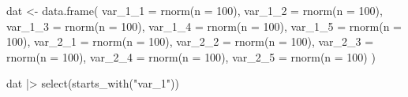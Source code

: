 \documentclass[
  letterpaper,
  DIV=11,
  numbers=noendperiod]{scrreprt}
\newenvironment{Shaded}{\begin{snugshade}}{\end{snugshade}}
\newcommand{\AttributeTok}[1]{\textcolor[rgb]{0.40,0.45,0.13}{#1}}
\newcommand{\DecValTok}[1]{\textcolor[rgb]{0.68,0.00,0.00}{#1}}
\newcommand{\FunctionTok}[1]{\textcolor[rgb]{0.28,0.35,0.67}{#1}}
\newcommand{\NormalTok}[1]{\textcolor[rgb]{0.00,0.23,0.31}{#1}}
\newcommand{\OtherTok}[1]{\textcolor[rgb]{0.00,0.23,0.31}{#1}}
\newcommand{\SpecialCharTok}[1]{\textcolor[rgb]{0.37,0.37,0.37}{#1}}
\newcommand{\StringTok}[1]{\textcolor[rgb]{0.13,0.47,0.30}{#1}}
\begin{document}
\begin{Shaded}
\begin{Highlighting}[]
\NormalTok{dat }\OtherTok{\textless{}{-}} \FunctionTok{data.frame}\NormalTok{(}
  \AttributeTok{var\_1\_1 =} \FunctionTok{rnorm}\NormalTok{(}\AttributeTok{n =} \DecValTok{100}\NormalTok{),}
  \AttributeTok{var\_1\_2 =} \FunctionTok{rnorm}\NormalTok{(}\AttributeTok{n =} \DecValTok{100}\NormalTok{),}
  \AttributeTok{var\_1\_3 =} \FunctionTok{rnorm}\NormalTok{(}\AttributeTok{n =} \DecValTok{100}\NormalTok{),}
  \AttributeTok{var\_1\_4 =} \FunctionTok{rnorm}\NormalTok{(}\AttributeTok{n =} \DecValTok{100}\NormalTok{),}
  \AttributeTok{var\_1\_5 =} \FunctionTok{rnorm}\NormalTok{(}\AttributeTok{n =} \DecValTok{100}\NormalTok{),}
  \AttributeTok{var\_2\_1 =} \FunctionTok{rnorm}\NormalTok{(}\AttributeTok{n =} \DecValTok{100}\NormalTok{),}
  \AttributeTok{var\_2\_2 =} \FunctionTok{rnorm}\NormalTok{(}\AttributeTok{n =} \DecValTok{100}\NormalTok{),}
  \AttributeTok{var\_2\_3 =} \FunctionTok{rnorm}\NormalTok{(}\AttributeTok{n =} \DecValTok{100}\NormalTok{),}
  \AttributeTok{var\_2\_4 =} \FunctionTok{rnorm}\NormalTok{(}\AttributeTok{n =} \DecValTok{100}\NormalTok{),}
  \AttributeTok{var\_2\_5 =} \FunctionTok{rnorm}\NormalTok{(}\AttributeTok{n =} \DecValTok{100}\NormalTok{)}
\NormalTok{)}

\NormalTok{dat }\SpecialCharTok{|\textgreater{}}
  \FunctionTok{select}\NormalTok{(}\FunctionTok{starts\_with}\NormalTok{(}\StringTok{"var\_1"}\NormalTok{)) }
\end{Highlighting}
\end{Shaded}
\end{document}
